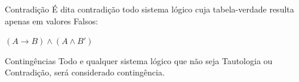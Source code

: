 \documentclass[aspectratio=169]{beamer}
\begin{document}
\begin{frame}{Contradição}
    É dita contradição todo sistema lógico cuja tabela-verdade resulta apenas em valores Falsos:

    $(A \rightarrow B) \wedge (A \wedge B')$

    \vspace{5mm}
    \begin{table}[hb]
    \end{table}
\end{frame}

\begin{frame}{Contingências}
    Todo e qualquer sistema lógico que não seja Tautologia ou Contradição, será considerado contingência.

\end{frame}
\end{document}
